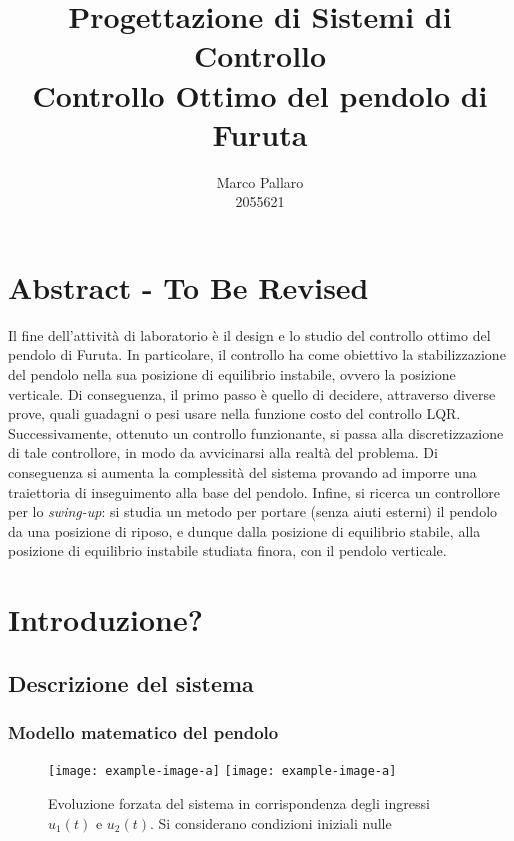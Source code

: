 \documentclass[11pt]{article}
\title{\vspace{-0.75cm} \Large \textbf{Progettazione di Sistemi di Controllo}\\[0.2cm] \Large \textbf{Controllo Ottimo del pendolo di Furuta} 
}
\author{Marco Pallaro \\[0.2cm] 2055621 }
\date{}
\begin{document}
\maketitle				%




\section*{Abstract - To Be Revised}

Il fine dell'attività di laboratorio è il design e lo studio del controllo ottimo del pendolo di Furuta.
In particolare, il controllo ha come obiettivo la stabilizzazione del pendolo nella sua posizione di equilibrio instabile, ovvero la posizione verticale.
Di conseguenza, il primo passo è quello di decidere, attraverso diverse prove, quali guadagni o pesi usare nella funzione costo del controllo LQR.
Successivamente, ottenuto un controllo funzionante, si passa alla discretizzazione di tale controllore, in modo da avvicinarsi alla realtà del problema.
Di conseguenza si aumenta la complessità del sistema provando ad imporre una traiettoria di inseguimento alla base del pendolo.
Infine, si ricerca un controllore per lo \textit{swing-up}: si studia un metodo per portare (senza aiuti esterni) il pendolo da una posizione di riposo, e dunque dalla posizione di equilibrio stabile, alla posizione di equilibrio instabile studiata finora, con il pendolo verticale. 


\section{Introduzione?}

\subsection{Descrizione del sistema}


\subsubsection*{Modello matematico del pendolo}

\begin{figure}[H]
	\centering
	\texttt{[image: example-image-a]}
    \texttt{[image: example-image-a]}
	\caption{Evoluzione forzata del sistema in corrispondenza degli ingressi $u_1(t)$ e $u_2(t)$. Si considerano condizioni iniziali nulle}
	\label{fig:11}
\end{figure}
\end{document}
